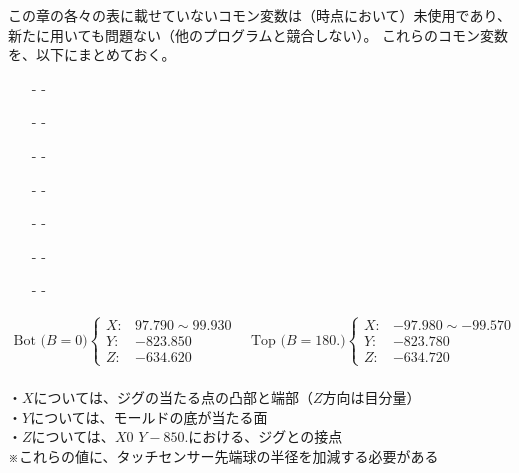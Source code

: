 \clearpage
この章の各々の表に載せていないコモン変数は（\dateUnusedVariables 時点において）未使用であり、新たに用いても問題ない（他のプログラムと競合しない）。
これらのコモン変数を、以下にまとめておく。
\begin{enumerate}
\item[-] -
\item[-] -
\item[-] -
\item[-] -
\item[-] -
\item[-] -
\item[-] -
\end{enumerate}


\vfill
\begin{tcolorbox}[title={2023/07/28時点の\MMname 実測値}, fonttitle=\gtfamily\bfseries]
\begin{align*}
  \text{Bot ($B=0$)}
  \left\{
  \begin{array}{rl}
    X: & 97.790 \sim 99.930\\
    Y: & -823.850\\
    Z: & -634.620
  \end{array}
  \right.\quad
  \text{Top ($B=180.$)}
  \left\{
  \begin{array}{rl}
    X: & -97.980 \sim -99.570\\
    Y: & -823.780\\
    Z: & -634.720
  \end{array}
  \right.
\end{align*}\\
・$X$については、ジグの当たる点の凸部と端部（$Z$方向は目分量）\\
・$Y$については、モールドの底が当たる面\\
・$Z$については、$X0$ $Y-850.$における、ジグとの接点\\
※これらの値に、タッチセンサー先端球の半径を加減する必要がある
\end{tcolorbox}
